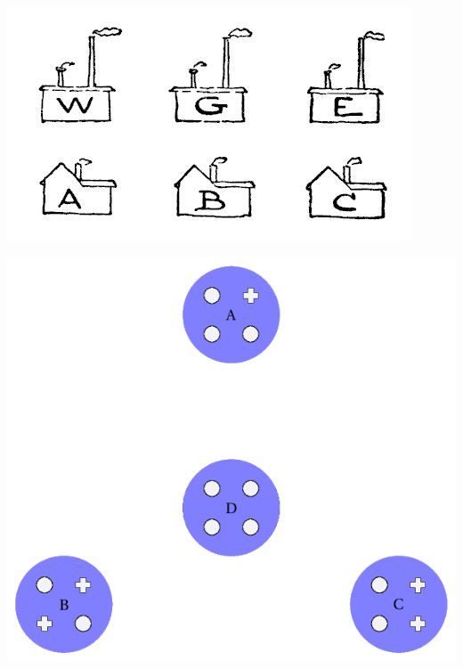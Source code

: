 \documentclass[a4paper,11pt]{article}
\begin{document}
\begin{multicols}{2}
\includegraphics[width=0.8\linewidth]{../images/Water_gaz_electricity_Dudeney}

\includegraphics[width=0.8\linewidth]{../images/BA_graphe_initial}
\end{multicols}
\end{document}
